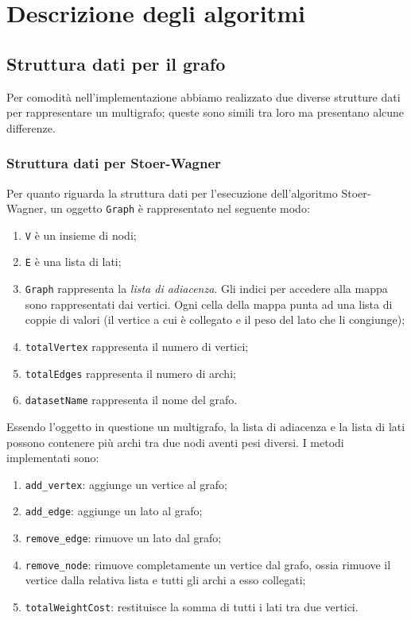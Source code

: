 \section{Descrizione degli algoritmi}

\subsection{Struttura dati per il grafo}

Per comodità nell'implementazione abbiamo realizzato due diverse strutture dati per rappresentare un multigrafo; queste sono simili tra loro ma presentano alcune differenze.

\subsubsection{Struttura dati per Stoer-Wagner}
Per quanto riguarda la struttura dati per l'esecuzione dell'algoritmo Stoer-Wagner, un oggetto \texttt{Graph} è rappresentato nel seguente modo:

\begin{enumerate}
    \item \verb|V| è un insieme di nodi;
    \item \verb|E| è una lista di lati;
    \item \verb|Graph| rappresenta la \textit{lista di adiacenza}.
    Gli indici per accedere alla mappa sono rappresentati dai vertici.
    Ogni cella della mappa punta ad una lista di coppie di valori
    (il vertice a cui è collegato e il peso del lato che li
    congiunge);
    \item \verb|totalVertex| rappresenta il numero di vertici;
    \item \verb|totalEdges| rappresenta il numero di archi;
    \item \verb|datasetName| rappresenta il nome del grafo.
\end{enumerate}
Essendo l'oggetto in questione un multigrafo, la lista di adiacenza e la lista di lati possono contenere più archi tra due nodi aventi pesi diversi.
\noindent I metodi implementati sono:
\begin{enumerate}
    \item \verb|add_vertex|: aggiunge un vertice al grafo;
    \item \verb|add_edge|: aggiunge un lato al grafo;
    \item \verb|remove_edge|: rimuove un lato dal grafo;
    \item \verb|remove_node|: rimuove completamente un vertice dal grafo, ossia rimuove il vertice dalla relativa lista e tutti gli archi a esso collegati;
    \item \verb|totalWeightCost|: restituisce la somma di tutti i lati tra due vertici.
\end{enumerate}

